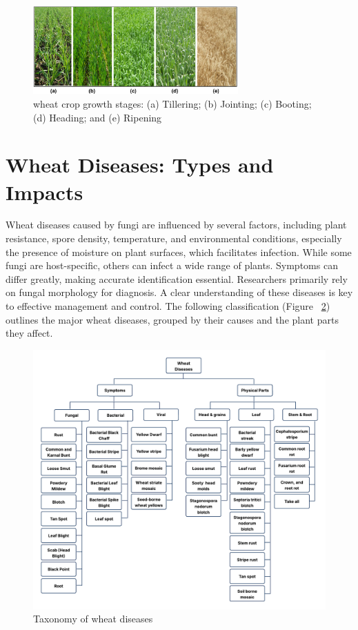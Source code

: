 \begin{figure}[H]
    \centering
    \includegraphics[width=0.7\textwidth]{chapters/chapter2/images/WheatStages.png}
    \caption{ wheat crop growth stages: (a) Tillering; (b) Jointing; (c) Booting; (d) Heading; and (e) Ripening \parencite{kumar2018estimation}}
    \label{fig:WheatStages}
\end{figure}



\section{Wheat Diseases: Types and Impacts}

Wheat diseases caused by fungi are influenced by several factors, including plant resistance, spore density, temperature, and environmental conditions, especially the presence of moisture on plant surfaces, which facilitates infection. While some fungi are host-specific, others can infect a wide range of plants. Symptoms can differ greatly, making accurate identification essential. Researchers primarily rely on fungal morphology for diagnosis. A clear understanding of these diseases is key to effective management and control. The following classification (Figure ~\ref{fig:Figure02}) outlines the major wheat diseases, grouped by their causes and the plant parts they affect.

\begin{figure}[H]
    \centering
    \includegraphics[width=0.8
    \textwidth]{chapters/chapter2/images/Figure02.png}
    \caption{Taxonomy of wheat diseases \protect\parencite{haider2021wheat}}
    \label{fig:Figure02}
\end{figure}


